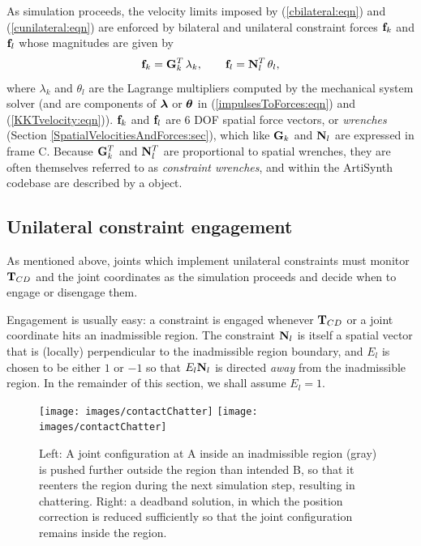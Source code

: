 As simulation proceeds, the velocity limits imposed by
(\ref{cbilateral:eqn}) and (\ref{cunilateral:eqn}) are enforced by
bilateral and unilateral 
constraint forces ${\bf f}_k$ and ${\bf f}_l$ whose
magnitudes are given by
%
\begin{equation}
{\bf f}_k = {\bf G}_k^T \, \lambda_k, \qquad {\bf f}_l = {\bf N}_l^T \, \theta_l,
\end{equation}
%
where $\lambda_k$ and $\theta_l$ are the Lagrange multipliers computed
by the mechanical system solver (and are components of $\boldsymbol\lambda$ or
$\boldsymbol\theta$ in (\ref{impulsesToForces:eqn}) and (\ref{KKTvelocity:eqn})).
${\bf f}_k$ and ${\bf f}_l$ are 6 DOF spatial force vectors, or {\it wrenches}
(Section \ref{SpatialVelocitiesAndForces:sec}), which like ${\bf G}_k$ and
${\bf N}_l$ are expressed in frame C. Because ${\bf G}_k^T$ and ${\bf N}_l^T$ are
proportional to spatial wrenches, they are often themselves referred
to as {\it constraint wrenches}, and within the ArtiSynth codebase are
described by a  object.

\subsection{Unilateral constraint engagement}
\label{UnilateralEngagement:sec}

As mentioned above, joints which implement unilateral constraints must
monitor ${\bf T}_{CD}$ and the joint coordinates as the simulation proceeds
and decide when to engage or disengage them.

Engagement is usually easy: a constraint is engaged whenever ${\bf T}_{CD}$
or a joint coordinate hits an inadmissible region. The constraint
${\bf N}_l$ is itself a spatial vector that is (locally) perpendicular to
the inadmissible region boundary, and $E_l$ is chosen to be either
$1$ or $-1$ so that $E_l {\bf N}_l$ is directed {\it away} from the
inadmissible region. In the remainder of this section, we shall assume
$E_l = 1$.

\begin{figure}[ht]
\begin{center}
\iflatexml
 \texttt{[image: images/contactChatter]}
\else
 \texttt{[image: images/contactChatter]}
\fi
\end{center}
\caption{Left: A joint configuration at A inside an inadmissible
region (gray) is pushed further outside the region than intended B,
so that it reenters the region during the next simulation step,
resulting in chattering. Right: a deadband solution, in which the
position correction is reduced sufficiently so that the joint
configuration remains inside the region.}
\label{contactChatter:fig}
\end{figure}

